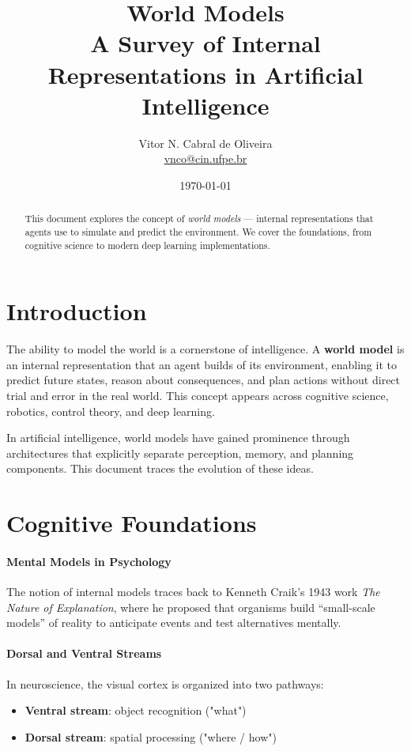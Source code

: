 \documentclass{tufte-handout}
\title{World Models \\ A Survey of Internal Representations in Artificial Intelligence}
\author{Vitor N. Cabral de Oliveira \\ \href{mailto:vnco@cin.ufpe.br}{vnco@cin.ufpe.br}}
\date{\today}
\begin{document}
\maketitle
\begin{abstract}
    This document explores the concept of \textit{world models} --- internal representations
    that agents use to simulate and predict the environment. We cover the foundations, from
    cognitive science to modern deep learning implementations.
\end{abstract}

\newpage
\hypersetup{linkcolor=wp-text}
\tableofcontents
\hypersetup{linkcolor=wp-primary}
\newpage

\section{Introduction}

The ability to model the world is a cornerstone of intelligence. A \textbf{world model} is an
internal representation that an agent builds of its environment, enabling it to predict future
states, reason about consequences, and plan actions without direct trial and error in the real
world. This concept appears across cognitive science, robotics, control theory, and deep learning.

In artificial intelligence, world models have gained prominence through architectures that
explicitly separate perception, memory, and planning components. This document traces the
evolution of these ideas.

\section{Cognitive Foundations}

\paragraph{Mental Models in Psychology}
The notion of internal models traces back to Kenneth Craik's 1943 work \textit{The Nature of
Explanation}, where he proposed that organisms build ``small-scale models'' of reality to
anticipate events and test alternatives mentally.

\paragraph{Dorsal and Ventral Streams}
In neuroscience, the visual cortex is organized into two pathways:
\begin{itemize}
    \item \textbf{Ventral stream}: object recognition ("what")
    \item \textbf{Dorsal stream}: spatial processing ("where / how")
\end{itemize}
\end{document}
